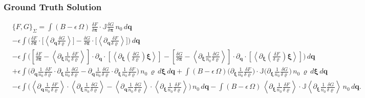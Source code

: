 \documentclass[10pt]{article}
\begin{document}
\subsubsection*{Ground Truth Solution}
\[ \boxed{\begin{align*}
&\{F,G\}_{\Sigma} = \int (B-\epsilon\,\Omega)\,\frac{\delta F}{\delta\bm{\pi}}\cdot \mathbb{J}\frac{\delta G}{\delta\bm{\pi}} \,n_0\,d\bm{q} \nonumber\\
%
&-\epsilon\int\bigg(\frac{\delta F}{\delta\bm{\pi}}\cdot \bigg[    \left\langle\partial_{\bm{q}}\frac{\delta G}{\delta\varrho}\right\rangle\bigg]-\frac{\delta G}{\delta\bm{\pi}}\cdot \bigg[  \left\langle\partial_{\bm{q}}\frac{\delta F}{\delta\varrho}\right\rangle\bigg]\bigg)\,d\bm{q}\nonumber\\
&- \epsilon \int \bigg(\left[\frac{\delta F}{\delta\bm{\pi}} - \left\langle\partial_{\bm{\xi}}\frac{1}{n_0}\frac{\delta F}{\delta\varrho}\right\rangle\right]\cdot\partial_{\bm{q}}\cdot\left[\left\langle\partial_{\bm{\xi}}\left(\frac{\delta G}{\delta\varrho}\right)\bm{\xi}\right\rangle\right] -\left[\frac{\delta G}{\delta\bm{\pi}} - \left\langle\partial_{\bm{\xi}}\frac{1}{n_0}\frac{\delta G}{\delta\varrho}\right\rangle\right]\cdot\partial_{\bm{q}}\cdot\left[\left\langle\partial_{\bm{\xi}}\left(\frac{\delta F}{\delta\varrho}\right)\bm{\xi}\right\rangle\right] \bigg)\,d\bm{q}\nonumber\\
&+\epsilon\int \bigg(\partial_{\bm{q}}\frac{1}{n_0}\frac{\delta F}{\delta \varrho}\cdot \partial_{\bm{\xi}}\frac{1}{n_0}\frac{\delta G}{\delta\varrho} -\partial_{\bm{q}}\frac{1}{n_0}\frac{\delta G}{\delta \varrho}\cdot \partial_{\bm{\xi}}\frac{1}{n_0}\frac{\delta F}{\delta\varrho} \bigg)\,n_0\,\varrho\,d\bm{\xi}\,d\bm{q} + \int (B-\epsilon\,\Omega)\bigg(\partial_{\bm{\xi}}\frac{1}{n_0}\frac{\delta F}{\delta\varrho}\bigg)\cdot\mathbb{J}\bigg(\partial_{\bm{\xi}}\frac{1}{n_0}\frac{\delta G}{\delta\varrho}\bigg)\,n_0\,\varrho\,d\bm{\xi}\,d\bm{q}\nonumber\\
&-\epsilon\int \bigg(\left\langle\partial_{\bm{q}}\frac{1}{n_0}\frac{\delta F}{\delta\varrho}\right\rangle\cdot\left\langle\partial_{\bm{\xi}}\frac{1}{n_0}\frac{\delta G}{\delta\varrho}\right\rangle-\left\langle\partial_{\bm{q}}\frac{1}{n_0}\frac{\delta G}{\delta\varrho}\right\rangle\cdot\left\langle\partial_{\bm{\xi}}\frac{1}{n_0}\frac{\delta F}{\delta\varrho}\right\rangle\bigg)\,n_0\,d\bm{q}-\int (B-\epsilon\,\Omega)\, \left\langle\partial_{\bm{\xi}}\frac{1}{n_0}\frac{\delta F}{\delta\varrho}\right\rangle\cdot \mathbb{J} \left\langle\partial_{\bm{\xi}}\frac{1}{n_0}\frac{\delta G}{\delta\varrho}\right\rangle\,n_0\,d\bm{q}.
\end{align*}} \]
\end{document}
